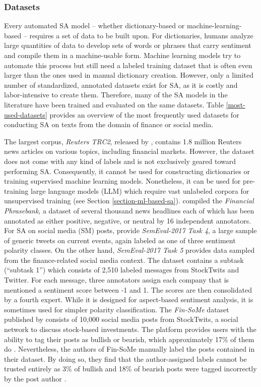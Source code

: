 \subsubsection{Datasets}
\label{section-datasets}
Every automated SA model -- whether dictionary-based or machine-learning-based -- requires a set of data to be built upon. For dictionaries, humans analyze large quantities of data to develop sets of words or phrases that carry sentiment and compile them in a machine-usable form. Machine learning models try to automate this process but still need a labeled training dataset that is often even larger than the ones used in manual dictionary creation. However, only a limited number of standardized, annotated datasets exist for SA, as it is costly and labor-intensive to create them. Therefore, many of the SA models in the literature have been trained and evaluated on the same datasets. Table \ref{most-used-datasets} provides an overview of the most frequently used datasets for conducting SA on texts from the domain of finance or social media.



The largest corpus, \emph{Reuters TRC2}, released by , contains 1.8 million Reuters news articles on various topics, including financial markets. However, the dataset does not come with any kind of labels and is not exclusively geared toward performing SA. Consequently, it cannot be used for constructing dictionaries or training supervised machine learning models. Nonetheless, it can be used for pre-training large language models (LLM) which require vast unlabeled corpora for unsupervised training (see Section \ref{section-ml-based-sa}).  compiled the \emph{Financial Phrasebank}, a dataset of several thousand news headlines each of which has been annotated as either positive, negative, or neutral by 16 independent annotators. For SA on social media (SM) posts,  provide \emph{SemEval-2017 Task 4}, a large sample of generic tweets on current events, again labeled as one of three sentiment polarity classes. On the other hand, \emph{SemEval-2017 Task 5}  provides data sampled from the finance-related social media context. The dataset contains a subtask (``subtask 1'') which consists of 2,510 labeled messages from StockTwits and Twitter. For each message, three annotators assign each company that is mentioned a sentiment score between -1 and 1. The scores are then consolidated by a fourth expert. While it is designed for aspect-based sentiment analysis, it is sometimes used for simpler polarity classification. The \emph{Fin-SoMe} dataset published by  consists of 10,000 social media posts from StockTwits, a social network to discuss stock-based investments. The platform provides users with the ability to tag their posts as bullish or bearish, which approximately 17\% of them do . Nevertheless, the authors of Fin-SoMe manually label the posts contained in their dataset. By doing so, they find that the author-assigned labels cannot be trusted entirely as 3\% of bullish and 18\% of bearish posts were tagged incorrectly by the post author .

